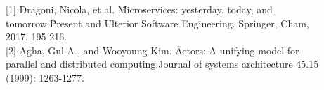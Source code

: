 \documentclass[final,hyperref={pdfpagelabels=true}]{beamer}
\begin{document}
\begin{frame}
  \vspace*{.5\baselineskip}

  \begin{columns}[t]
    \begin{column}{.04\textwidth}
    \end{column}
    \begin{column}{.92\textwidth}
      {\lmodern \footnotesize
        {[1]} Dragoni, Nicola, et al. \"Microservices: yesterday, today, and tomorrow.\" Present and Ulterior Software Engineering. Springer, Cham, 2017. 195-216.
        \\
        {[2]} Agha, Gul A., and Wooyoung Kim. \"Actors: A unifying model for parallel and distributed computing.\" Journal of systems architecture 45.15 (1999): 1263-1277.
      }
    \end{column}
    \begin{column}{.04\textwidth}
    \end{column}
  \end{columns}

\end{frame}
\end{document}
